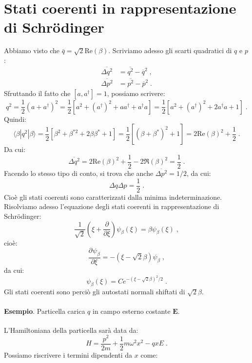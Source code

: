 \documentclass[12pt,a4paper]{report}
\theoremstyle{definition}
\newcommand{\pdev}[3][]{\frac{\partial^{#1} #2}{\partial #3^{#1}}}
\numberwithin{equation}{section}
\newcommand{\bra}{\langle}
\newcommand{\ket}{\rangle}
\newcommand{\Sch}{Schrödinger}
\newcommand{\adj}[1]{#1^{\dagger}}
\begin{document}
\section{Stati coerenti in rappresentazione di \Sch}
Abbiamo visto che $\bar{q}=\sqrt{2}\mathrm{Re}(\beta)$. Scriviamo adesso gli scarti quadratici di $q$ e $p$:
\begin{align*}
\overline{\Delta q^2} &=\overline{q^2}-\overline{q}^2\;, \\
\overline{\Delta p^2} &= \overline{p^2}-\overline{p}^2\;.
\end{align*}
Sfruttando il fatto che $[a,\adj{a}]=1$, possiamo scrivere:
$$
q^2=\frac{1}{2}(a+\adj{a})^2=\frac{1}{2}\left[a^2+(\adj{a})^2+a\adj{a}+\adj{a}a\right]=\frac{1}{2}\left[a^2+(\adj{a})^2+2\adj{a}a+1\right]\;.
$$
Quindi:
\begin{equation}
\bra\beta|q^2|\beta\ket=\frac{1}{2}\left[\beta^2+\beta^{*2}+2\beta\beta^*+1\right]=\frac{1}{2}\left[(\beta+\beta^*)^2+1\right]=2\mathrm{Re}(\beta)^2+\frac{1}{2}\;.
\end{equation}
Da cui:
\begin{equation}
\overline{\Delta q^2}=2\mathrm{Re}(\beta)^2+\frac{1}{2}-2\Re(\beta)^2=\frac{1}{2}\;.
\end{equation}
Facendo lo stesso tipo di conto, si trova che anche $\overline{\Delta p^2}=1/2$, da cui:
$$
\Delta q\Delta p=\frac{1}{2}\;.
$$
Cioè gli stati coerenti sono caratterizzati dalla minima indeterminazione. Risolviamo adesso l'equazione degli stati coerenti in rappresentazione di \Sch:
\begin{equation}
\frac{1}{\sqrt{2}}\left(\xi+\frac{\partial}{\partial\xi}\right)\psi_{\beta}(\xi)=\beta\psi_{\beta}(\xi)\;,
\end{equation}
cioè:
$$
\pdev{\psi_{\beta}}{\xi}=-(\xi-\sqrt{2}\beta)\psi_{\beta}\;,
$$
da cui:
\begin{equation}
\psi_{\beta}(\xi)=Ce^{-(\xi-\sqrt{2}\beta)^2/2}\;.
\end{equation}
Gli stati coerenti sono perciò gli autostati normali shiftati di $\sqrt{2}\beta$. \\
\\
\textbf{Esempio}. Particella carica $q$ in campo esterno costante $\mathbf{E}$. \\
\\
L'Hamiltoniana della particella sarà data da:
\begin{equation}
H=\frac{p^2}{2m}+\frac{1}{2}m\omega^2 x^2-qxE\;.
\end{equation}
Possiamo riscrivere i termini dipendenti da $x$ come:
\end{document}
